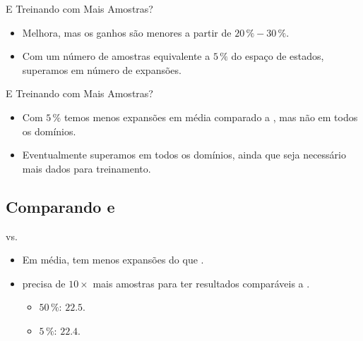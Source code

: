 \documentclass{beamer}
\begin{document}
\begin{frame}{E Treinando com Mais Amostras?}

\begin{itemize}
  \item Melhora, mas os ganhos são menores a partir de $20\,\% - 30\,\%$.
  \pause
  \item Com um número de amostras equivalente a \alert{$5\,\%$} do espaço de estados, \alert{superamos \poff} em número de expansões.
\end{itemize}
\end{frame}

\begin{frame}{E Treinando com Mais Amostras?}

\begin{itemize}
 \item Com $5\,\%$ temos menos expansões em média comparado a \poff, mas não em todos os domínios.
 \item Eventualmente superamos \poff em \alert{todos} os domínios, ainda que seja necessário mais dados para treinamento.
\end{itemize}
\end{frame}

\subsection{Comparando \bfsrs e \bfsrw}
\begin{frame}{\bfsrs vs. \bfsrw}

\begin{itemize}
  \item Em média, \pog \alert{tem menos expansões do que} \pofsm.
  \pause
  \item \pofsm \alert{precisa de $10\times$ mais amostras} para ter resultados comparáveis a \pog.
    \begin{itemize}
      \item \pofsm $50\,\%$: $22.5$.
      \item \pog $5\,\%$: $22.4$.
    \end{itemize}
\end{itemize}
\end{frame}
\end{document}
